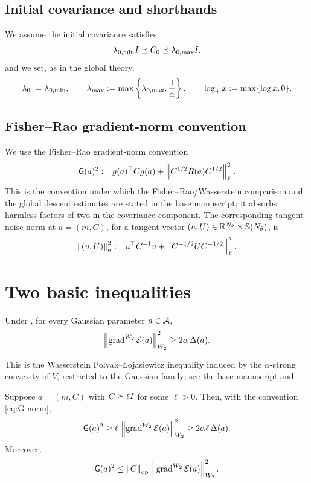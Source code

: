 \subsection{Initial covariance and shorthands}

We assume the initial covariance satisfies
\[
    \lambda_{0,\min}I\preceq C_0\preceq \lambda_{0,\max}I,
\]
and we set, as in the global theory,
\[
    \lambda_0:=\lambda_{0,\min},
    \qquad
    \lambda_{\max}:=
    \max\left\{
        \lambda_{0,\max},\frac1\alpha
    \right\},
    \qquad
    \log_+ x:=\max\{\log x,0\}.
\]

\subsection{Fisher--Rao gradient-norm convention}

We use the Fisher--Rao gradient-norm convention
\begin{equation}
\label{eq:G-norm}
    \mathsf{G}(a)^2
    :=
    g(a)^\top Cg(a)
    +
    \left\lVert C^{1/2}R(a)C^{1/2}\right\rVert_{\mathrm{F}}^2 .
\end{equation}
This is the convention under which the Fisher--Rao/Wasserstein comparison and the global
descent estimates are stated in the base manuscript; it absorbs harmless factors of two
in the covariance component. The corresponding tangent-noise norm at $a=(m,C)$, for a
tangent vector $(u,U)\in\mathbb{R}^{N_\theta}\times\mathbb{S}(N_\theta)$, is
\begin{equation}
\label{eq:tangent-norm}
    \left\lVert (u,U)\right\rVert_a^2
    :=
    u^\top C^{-1}u+\left\lVert C^{-1/2}UC^{-1/2}\right\rVert_{\mathrm{F}}^2 .
\end{equation}

\section{Two basic inequalities}

\begin{lemma}
\label{lem:W2-PL}
Under , for every Gaussian parameter $a\in\mathcal{A}$,
\[
    \left\lVert \operatorname{grad}^{W_2}\mathcal{E}(a)\right\rVert_{W_2}^2
    \geq
    2\alpha\,\Delta(a).
\]
\end{lemma}

This is the Wasserstein Polyak--{\L}ojasiewicz inequality induced by the
$\alpha$-strong convexity of $V$, restricted to the Gaussian family; see the base
manuscript and \cite{lambert2022variational}.

\begin{lemma}
\label{lem:FR-W2}
Suppose $a=(m,C)$ with $C\succeq\ell I$ for some $\ell>0$. Then, with the convention
\eqref{eq:G-norm},
\[
    \mathsf{G}(a)^2
    \geq
    \ell\,\left\lVert \operatorname{grad}^{W_2}\mathcal{E}(a)\right\rVert_{W_2}^2
    \geq
    2\alpha\ell\,\Delta(a).
\]
Moreover,
\[
    \mathsf{G}(a)^2
    \leq
    \left\lVert C\right\rVert_{\mathrm{op}}\,\left\lVert \operatorname{grad}^{W_2}\mathcal{E}(a)\right\rVert_{W_2}^2 .
\]
\end{lemma}

